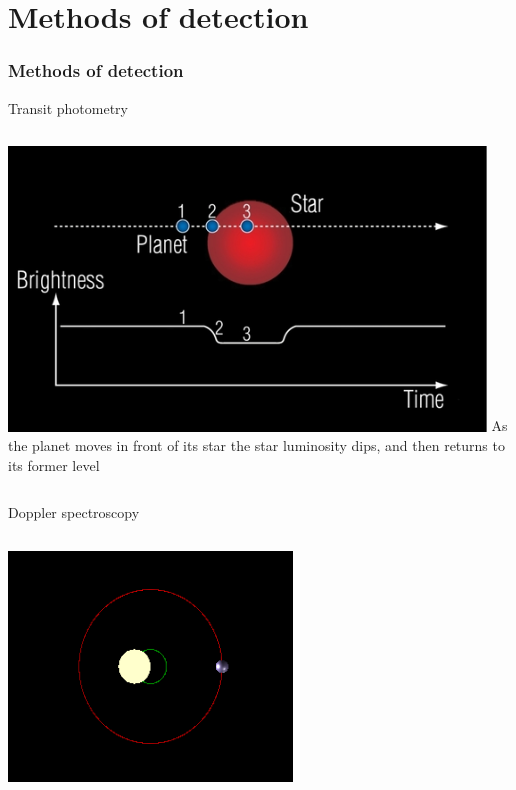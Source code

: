 \documentclass{beamer}
\begin{document}
\section{Methods of detection}
\begin{frame}
\frametitle{Methods of detection}
\begin{block}{Transit photometry}
\begin{columns}[T]
\includegraphics[width=0.95\textwidth]{img/20130108_Planetary_transit_f537.jpg}
As the planet moves in front of its star the star luminosity dips, and then returns to its former level
\end{columns}
\end{block}
\begin{block}{Doppler spectroscopy}
\begin{columns}[T]
\includegraphics[width=0.95\textwidth]{img/Dopplerspectr-above.png}

\end{columns}
\end{block}
\end{frame}
\end{document}
